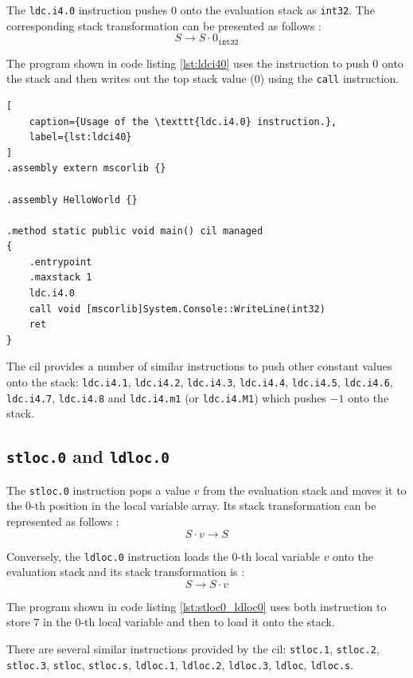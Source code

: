 \documentclass[declaration,shortabstract,english,mgr]{iithesis}
\begin{document}
The \texttt{ldc.i4.0} instruction pushes $0$ onto the evaluation stack as \texttt{int32}. The corresponding stack transformation can be presented as follows \cite{ecmaStandard}:
$$
	S \rightarrow S \cdot 0_\texttt{int32}
$$

The program shown in code listing \ref{lst:ldci40} uses the instruction to push $0$ onto the stack and then writes out the top stack value ($0$) using the \texttt{call} instruction.

\begin{lstlisting}[
	caption={Usage of the \texttt{ldc.i4.0} instruction.},
	label={lst:ldci40}
]
.assembly extern mscorlib {}

.assembly HelloWorld {}

.method static public void main() cil managed
{
	.entrypoint
	.maxstack 1
	ldc.i4.0
	call void [mscorlib]System.Console::WriteLine(int32)
	ret
}
\end{lstlisting}

The \acrshort{cil} provides a number of similar instructions to push other constant values onto the stack: \texttt{ldc.i4.1}, \texttt{ldc.i4.2}, \texttt{ldc.i4.3}, \texttt{ldc.i4.4}, \texttt{ldc.i4.5}, \texttt{ldc.i4.6}, \texttt{ldc.i4.7}, \texttt{ldc.i4.8} and \texttt{ldc.i4.m1} (or \texttt{ldc.i4.M1}) which pushes $-1$ onto the stack.

\subsection{\texttt{stloc.0} and \texttt{ldloc.0}}
\label{sec:desc_stloc0_ldloc0}

The \texttt{stloc.0} instruction pops a value $v$ from the evaluation stack and moves it to the $0$-th position in the local variable array. Its stack transformation can be represented as follows \cite{ecmaStandard}:
$$
	S \cdot v \rightarrow S
$$

Conversely, the \texttt{ldloc.0} instruction loads the $0$-th local variable $v$ onto the evaluation stack and its stack transformation is \cite{ecmaStandard}:
$$
	S \rightarrow S \cdot v
$$

The program shown in code listing \ref{lst:stloc0_ldloc0} uses both instruction to store $7$ in the $0$-th local variable and then to load it onto the stack.

There are several similar instructions provided by the \acrshort{cil}: \texttt{stloc.1}, \texttt{stloc.2}, \texttt{stloc.3}, \texttt{stloc}, \texttt{stloc.s}, \texttt{ldloc.1}, \texttt{ldloc.2}, \texttt{ldloc.3}, \texttt{ldloc}, \texttt{ldloc.s}.
\end{document}
